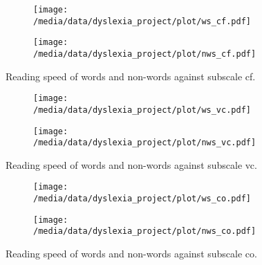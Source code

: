 \documentclass[11pt, a4paper, twoside, openright]{article}
\begin{document}
\begin{figure}[h!] 
\centering 
\begin{subfigure}{1\textwidth}
\centering
\texttt{[image: /media/data/dyslexia\_project/plot/ws\_cf.pdf]}
\caption{}
\label{fig:11a}
\end{subfigure}
\end{figure}
\begin{figure}
\ContinuedFloat
\centering 
\begin{subfigure}{1\textwidth}
\centering
\texttt{[image: /media/data/dyslexia\_project/plot/nws\_cf.pdf]}
\caption{}
\label{fig:11b}
\end{subfigure}
\caption{Reading speed of words and non-words against subscale cf.}
\label{fig:11}
\end{figure}

\begin{figure}[h!] 
\centering 
\begin{subfigure}{1\textwidth}
\centering
\texttt{[image: /media/data/dyslexia\_project/plot/ws\_vc.pdf]}
\caption{}
\label{fig:12a}
\end{subfigure}
\end{figure}
\begin{figure}
\ContinuedFloat
\centering 
\begin{subfigure}{1\textwidth}
\centering
\texttt{[image: /media/data/dyslexia\_project/plot/nws\_vc.pdf]}
\caption{}
\label{fig:12b}
\end{subfigure}
\caption{Reading speed of words and non-words against subscale vc.}
\label{fig:12}
\end{figure}

\begin{figure}[h!] 
\centering 
\begin{subfigure}{1\textwidth}
\centering
\texttt{[image: /media/data/dyslexia\_project/plot/ws\_co.pdf]}
\caption{}
\label{fig:13a}
\end{subfigure}
\end{figure}
\begin{figure}
\ContinuedFloat
\centering 
\begin{subfigure}{1\textwidth}
\centering
\texttt{[image: /media/data/dyslexia\_project/plot/nws\_co.pdf]}
\caption{}
\label{fig:13b}
\end{subfigure}
\caption{Reading speed of words and non-words against subscale co.}
\label{fig:13}
\end{figure}
\end{document}
